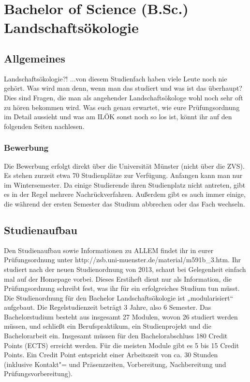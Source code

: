 \chapter{Bachelor of Science (B.Sc.) Landschaftsökologie}

\section{Allgemeines}
Landschaftsökologie?! ...von diesem Studienfach haben viele Leute noch nie gehört. Was wird man denn, wenn man das studiert und was ist das überhaupt? Dies sind Fragen, die man als angehender Landschaftsökologe wohl noch sehr oft zu hören bekommen wird. Was euch genau erwartet, wie eure Prüfungsordnung im Detail aussieht und was am ILÖK sonst noch so los ist, könnt ihr auf den folgenden Seiten nachlesen.

\subsection*{Bewerbung}
Die Bewerbung erfolgt direkt über die Universität Münster (nicht über die ZVS). Es stehen zurzeit etwa 70 Studienplätze zur Verfügung. Anfangen kann man nur im Wintersemester. Da einige Studierende ihren Studienplatz nicht antreten, gibt es in der Regel mehrere Nachrückverfahren. Außerdem gibt es auch immer einige, die während der ersten Semester das Studium abbrechen oder das Fach wechseln.

\section{Studienaufbau}
Den Studienaufbau sowie Informationen zu ALLEM findet ihr in eurer Prüfungsordnung unter http://zsb.uni-muenster.de/material/m591b\_3.htm. Ihr studiert nach der neuen Studienordnung von 2013, schaut bei Gelegenheit einfach mal auf der Homepage vorbei. Dieses Erstiheft dient nur als Information, die Prüfungsordnung schreibt fest, was ihr für ein erfolgreiches Studium tun müsst. 
Die Studienordnung für den Bachelor Landschaftsökologie ist „modularisiert“ aufgebaut. Die Regelstudienzeit beträgt 3 Jahre, also 6 Semester. Das Bachelorstudium besteht aus insgesamt 27 Modulen, wovon 26 studiert werden müssen, und schließt ein Berufspraktikum, ein Studienprojekt und die Bachelorarbeit ein. Insgesamt müssen für den Bachelorabschluss 180 Credit Points (ECTS) erreicht werden. Für die meisten Module gibt es 5 bis 15 Credit Points. Ein Credit Point entspricht einer Arbeitszeit von ca. 30 Stunden (inklusive Kontakt"= und Präsenzzeiten, Vorbereitung, Nachbereitung und Prüfungsvorbereitung). 

